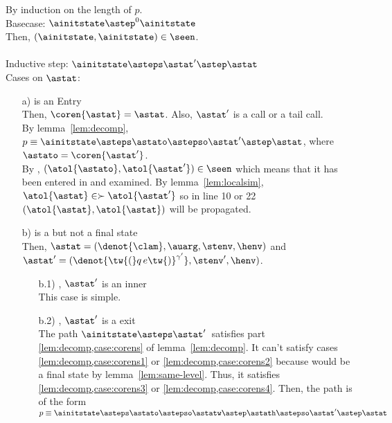 \documentclass{LMCS}
\theoremstyle{definition} \newtheorem{property}[thm]{Property}
\begin{document}
\proof
By induction on the length of $p$. \\
Basecase: $\ainitstate \astep^0 \ainitstate$ \\
Then, $(\ainitstate, \ainitstate) \in \seen$. \\ 
\\
Inductive step: $\ainitstate \asteps \astat' \astep \astat$ \\
Cases on $\astat$:
\begin{enumerate}[$\bullet$]
\item[a)]
  \astat{} is an Entry \\
  Then, $\coren{\astat} = \astat$.
  Also, $\astat'$ is a call or a tail call. \\
  By lemma~\ref{lem:decomp}, $p \equiv \ainitstate \asteps \astato 
  \astepso \astat' \astep \astat$, 
  where $\astato = \coren{\astat'}$. \\
  By \ih, $(\atol{\astato}, \atol{\astat'}) \in \seen$ which means that it 
  has been entered in \work{} and examined.
  By lemma~\ref{lem:localsim}, 
  $\atol{\astat} \in \succ{\atol{\astat'}}$
  so in line 10 or 22 $(\atol{\astat}, \atol{\astat})$ will be propagated.
\item[b)]
  \newcommand{\qcallp}{\ensuremath{\tw{(}q \, e\tw{)}^{\gamma'}}}
  \newcommand{\ulamone}{\ensuremath{\tw{(}\lambda_{l_1}\tw{(}u_1\,k_1\tw{)}\,\mcall_1\tw{)}}}
  \newcommand{\ucalltwo}{\ensuremath{\tw{(}f_2 \: e_2 \: q_2\tw{)}^{l_2}}}
\astat{} is a \dacapply{} but not a final state \\
  Then, $\astat = (\denot{\clam}, \auarg, \stenv, \henv)$ 
  and $\astat' = (\denot{\qcallp}, \stenv', \henv)$.
  \begin{enumerate}[$\bullet$]
  \item[b.1)]
    , \ie{} $\astat'$ is an inner \daceval \\
    This case is simple.
  \item[b.2)]
    , \ie{} $\astat'$ is a \daceval{} exit \\
    The path $\ainitstate \asteps \astat'\,$ satisfies part
    \ref{lem:decomp,case:corens} of lemma~\ref{lem:decomp}.
    It can't satisfy cases
    \ref{lem:decomp,case:corens1} or \ref{lem:decomp,case:corens2}
    because \astat{} would be a final state by lemma~\ref{lem:same-level}.
    Thus, it satisfies 
    \ref{lem:decomp,case:corens3} or \ref{lem:decomp,case:corens4}.
    Then, the path is of the form 
    $p \equiv \ainitstate \asteps \astato \astepso \astatw
    \astep \astath \astepso \astat' \astep \astat$ \\

\end{enumerate}
\end{enumerate}
\end{document}
